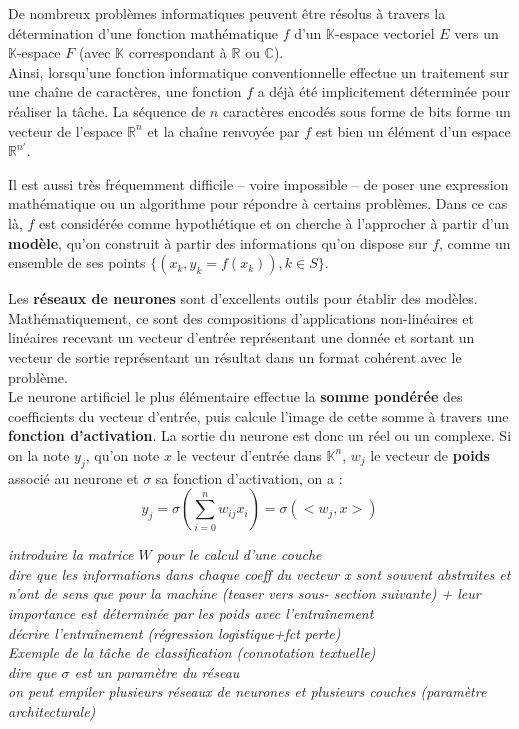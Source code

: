 \documentclass[12pt, french]{report}
\begin{document}
De nombreux problèmes informatiques peuvent être résolus à travers la détermination
d'une fonction mathématique $f$ d'un $\mathbb{K}$-espace vectoriel $E$ vers un 
$\mathbb{K}$-espace $F$ (avec $\mathbb{K}$ correspondant à $\mathbb{R}$ ou
$\mathbb{C}$).\\
Ainsi, lorsqu'une fonction informatique conventionnelle effectue un traitement sur
une chaîne de caractères, une fonction $f$ a déjà été implicitement déterminée pour
réaliser la tâche.
La séquence de $n$ caractères encodés sous forme de bits forme un vecteur de l'espace
$\mathbb{R}^n$ et la chaîne renvoyée par $f$ est bien un élément d'un espace
$\mathbb{R}^{n'}$.

Il est aussi très fréquemment difficile -- voire impossible --
de poser une expression mathématique ou un algorithme pour répondre à certains 
problèmes. Dans ce cas là, $f$ est considérée comme hypothétique et on cherche à
l'approcher à partir d'un \textbf{modèle}, qu'on construit à partir des informations
qu'on dispose sur $f$, comme un ensemble de ses points 
$\{(x_k, y_k=f(x_k)), k \in S\}$.

\vspace{12pt}
Les \textbf{réseaux de neurones} sont d'excellents outils pour établir des modèles.
Mathématiquement, ce sont des compositions d'applications non-linéaires et linéaires
recevant un vecteur d'entrée représentant une donnée et sortant un vecteur de sortie
représentant un résultat dans un format cohérent avec le problème.\\
Le neurone artificiel le plus élémentaire effectue la \textbf{somme pondérée} des 
coefficients du vecteur d'entrée, puis calcule l'image de cette somme à travers
une \textbf{fonction d'activation}. La sortie du neurone est donc un réel ou un
complexe. Si on la note $y_j$, qu'on note $x$ le vecteur d'entrée dans $\mathbb{K}^n$,
$w_j$ le vecteur de \textbf{poids} associé au neurone et $\sigma$ sa fonction d'activation,
on a :
\begin{equation}
    y_j = \sigma(\sum_{i=0}^{n} w_{ij}x_i) = \sigma(<w_j, x>)
\end{equation}

\textit{introduire la matrice $W$ pour le calcul d'une couche\\
dire que les informations dans chaque coeff du vecteur x sont 
souvent abstraites et n'ont de sens que pour la machine (teaser vers sous-
section suivante) + leur importance est déterminée par les poids avec
l'entraînement\\ décrire l'entraînement (régression logistique+fct perte) \\
Exemple de la tâche de classification (connotation textuelle)\\
dire que $\sigma$ est un paramètre du réseau\\
on peut empiler plusieurs réseaux de neurones et plusieurs couches (paramètre
architecturale)}\\
\end{document}
